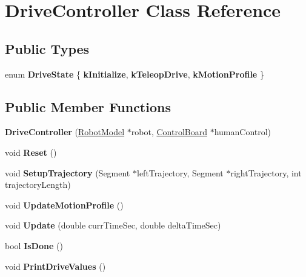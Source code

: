 \hypertarget{class_drive_controller}{}\section{Drive\+Controller Class Reference}
\label{class_drive_controller}
\subsection*{Public Types}
\begin{DoxyCompactItemize}
\item 
\mbox{\label{class_drive_controller_abb183068492c689edb76fe802a4a35ad}} 
enum {\bfseries Drive\+State} \{ {\bfseries k\+Initialize}, 
{\bfseries k\+Teleop\+Drive}, 
{\bfseries k\+Motion\+Profile}
 \}
\end{DoxyCompactItemize}
\subsection*{Public Member Functions}
\begin{DoxyCompactItemize}
\item 
\mbox{\label{class_drive_controller_a166bb5ed50199d8482ebbc0e244742a1}} 
{\bfseries Drive\+Controller} (\hyperlink{class_robot_model}{Robot\+Model} $\ast$robot, \hyperlink{class_control_board}{Control\+Board} $\ast$human\+Control)
\item 
\mbox{\label{class_drive_controller_afb1d02465d9feb19335db06c6d686552}} 
void {\bfseries Reset} ()
\item 
\mbox{\label{class_drive_controller_af4ca4d578446f17730c960a3650fb140}} 
void {\bfseries Setup\+Trajectory} (Segment $\ast$left\+Trajectory, Segment $\ast$right\+Trajectory, int trajectory\+Length)
\item 
\mbox{\label{class_drive_controller_a80935e19c13c8f9212054af0183e53ad}} 
void {\bfseries Update\+Motion\+Profile} ()
\item 
\mbox{\label{class_drive_controller_aefc9e8cbe2948d2e72987e0a8a2cbf80}} 
void {\bfseries Update} (double curr\+Time\+Sec, double delta\+Time\+Sec)
\item 
\mbox{\label{class_drive_controller_ae07d828e9b1738bd0baf6dca46e5bd5c}} 
bool {\bfseries Is\+Done} ()
\item 
\mbox{\label{class_drive_controller_abbcf50b6d01eda0d1a45131dfeb97db8}} 
void {\bfseries Print\+Drive\+Values} ()
\end{DoxyCompactItemize}
